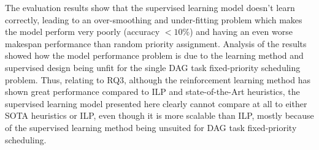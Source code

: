 The evaluation results show that the supervised learning model
doesn't learn correctly, leading to an over-smoothing and under-fitting problem
which makes the model perform very poorly (accuracy $<10$\%)
and having an even worse makespan performance than random priority assignment.
Analysis of the results showed how the model performance problem
is due to the learning method and supervised design being unfit for
the single DAG task fixed-priority scheduling problem.
Thus, relating to RQ3, although the reinforcement learning
method has shown great performance compared to ILP\cite{Zhao2024GATDRLmodel}
and state-of-the-Art heuristics\cite{Lee2021GlobalDagSchedDRL},
the supervised learning model presented here 
clearly cannot compare at all to either SOTA heuristics
or ILP, even though it is more scalable than ILP, 
mostly because of the supervised learning method being unsuited 
for DAG task fixed-priority scheduling.